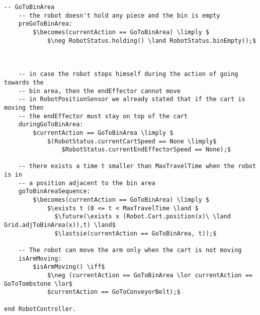 \begin{lstlisting}[fontadjust, mathescape, frame=single]
  -- GoToBinArea
    -- the robot doesn't hold any piece and the bin is empty
    preGoToBinArea:
        $\becomes(currentAction == GoToBinArea) \limply $
            $\neg RobotStatus.holding() \land RobotStatus.binEmpty();$
    


    -- in case the robot stops himself during the action of going towards the 
    -- bin area, then the endEffector cannot move
    -- in RobotPositionSensor we already stated that if the cart is moving then 
    -- the endEffector must stay on top of the cart
    duringGoToBinArea:
        $currentAction == GoToBinArea \limply $
            $(RobotStatus.currentCartSpeed == None \limply$
                $RobotStatus.currentEndEffectorSpeed == None);$

    -- there exists a time t smaller than MaxTravelTime when the robot is in 
    -- a position adjacent to the bin area
    goToBinAreaSequence:
        $\becomes(currentAction == GoToBinArea) \limply $
            $\exists t (0 <= t < MaxTravelTime \land $
              $\future(\exists x (Robot.Cart.position(x)\ \land Grid.adjToBinArea(x)),t) \land$
              $\lastsie(currentAction == GoToBinArea, t));$
                      
    -- The robot can move the arm only when the cart is not moving
    isArmMoving: 
        $isArmMoving() \iff$
            $\neg (currentAction == GoToBinArea \lor currentAction == GoToTombstone \lor$
            $currentAction == GoToConveyorBelt);$
         
end RobotController.
\end{lstlisting}


